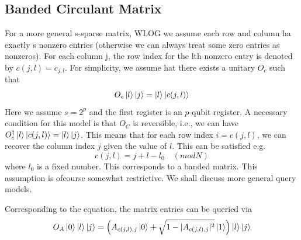 \documentclass[12pt, oneside]{book}
\theoremstyle{definition}
\theoremstyle{definition}
\theoremstyle{remark}
\begin{document}
\subsection{Banded Circulant Matrix}
For a more general s-sparse matrix, WLOG we assume each row and column ha exactly s nonzero entries (otherwise we can always treat some zero entries as nonzeros). For each column j, the row index for the lth nonzero entry is denoted by $c(j,l)=c_{j,l}$. For simplicity, we assume hat there exists a unitary $O_c$ such that
\[
O_c\ket{l}\ket{j}=\ket{l}\ket{c(j,l)}
\]
Here we assume $s=2^{p}$ and the first register is an $p$-qubit register. A necessary condition for this model is that $O_C$ is reversible, i.e., we can have $O_c^{\dagger}\ket{l}\ket{c(j,l)}=\ket{l}\ket{j}$. This means that for each row index $i=c(j,l)$, we can recover the column index $j$ given the value of $l$. This can be satisfied e.g.
\[
c(j,l)=j+l-l_0 \quad (mod N)
\]
where $l_0$ is a fixed number. This corresponds to a banded matrix. This assumption is ofcourse somewhat restrictive. We shall discuss more general query models.

Corresponding to the equation, the matrix entries can be queried via
\[
O_A\ket{0}\ket{l}\ket{j}=\left(A_{c(j,l),j}\ket{0}+\sqrt{1-|A_{c(j,l),j}|^2}\ket{1}\right) \ket{l}\ket{j}
\]
\end{document}
